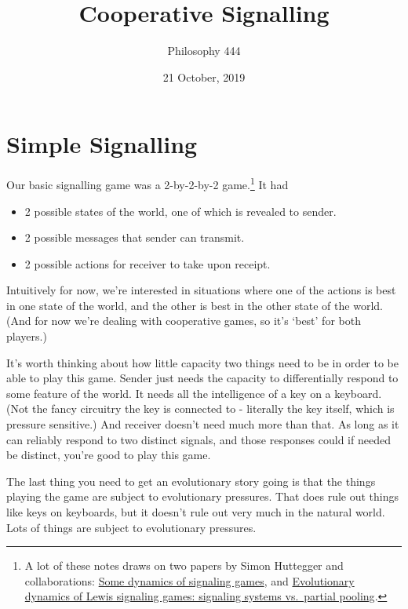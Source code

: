 \documentclass[11pt,]{article}
\title{Cooperative Signalling}
\author{Philosophy 444}
\date{21 October, 2019}
\providecommand{\tightlist}{%
  \setlength{\itemsep}{0pt}\setlength{\parskip}{0pt}}
\let\rmarkdownfootnote\footnote%
\def\footnote{\protect\rmarkdownfootnote}
\begin{document}
\maketitle

\hypertarget{simple-signalling}{%
\section{Simple Signalling}\label{simple-signalling}}

Our basic signalling game was a 2-by-2-by-2 game.\footnote{A lot of
  these notes draws on two papers by Simon Huttegger and collaborations:
  \href{https://www.pnas.org/content/111/Supplement_3/10873}{Some
  dynamics of signaling games}, and
  \href{https://faculty.sites.uci.edu/shuttegg/files/2011/03/Hutteggeral2009.pdf}{Evolutionary
  dynamics of Lewis signaling games: signaling systems vs.~partial
  pooling}.} It had

\begin{itemize}
\tightlist
\item
  2 possible states of the world, one of which is revealed to sender.
\item
  2 possible messages that sender can transmit.
\item
  2 possible actions for receiver to take upon receipt.
\end{itemize}

Intuitively for now, we're interested in situations where one of the
actions is best in one state of the world, and the other is best in the
other state of the world. (And for now we're dealing with cooperative
games, so it's `best' for both players.)

It's worth thinking about how little capacity two things need to be in
order to be able to play this game. Sender just needs the capacity to
differentially respond to some feature of the world. It needs all the
intelligence of a key on a keyboard. (Not the fancy circuitry the key is
connected to - literally the key itself, which is pressure sensitive.)
And receiver doesn't need much more than that. As long as it can
reliably respond to two distinct signals, and those responses could if
needed be distinct, you're good to play this game.

The last thing you need to get an evolutionary story going is that the
things playing the game are subject to evolutionary pressures. That does
rule out things like keys on keyboards, but it doesn't rule out very
much in the natural world. Lots of things are subject to evolutionary
pressures.
\end{document}
